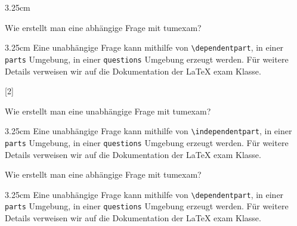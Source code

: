 \documentclass[german, @CLASSOPTIONS@]{tumexam}
\begin{document}
\begin{questions}
\begin{parts}
\begin{solutionbox}{3.25cm}
    \end{solutionbox}
    \dependentpart
    Wie erstellt man eine abhängige Frage mit tumexam?
    \begin{solutionbox}{3.25cm}
      Eine unabhängige Frage kann mithilfe von \texttt{\textbackslash{dependentpart}}, in einer \texttt{parts} Umgebung, in einer \texttt{questions} Umgebung erzeugt werden. Für weitere Details verweisen wir auf die Dokumentation der \LaTeX{} exam Klasse.
    \end{solutionbox}
  \end{parts}
  \clearpage
  [2]
  \begin{parts}
    \independentpart
    Wie erstellt man eine unabhängige Frage mit tumexam?
    \begin{solutionbox}{3.25cm}
      Eine unabhängige Frage kann mithilfe von \texttt{\textbackslash{independentpart}}, in einer \texttt{parts} Umgebung, in einer \texttt{questions} Umgebung erzeugt werden. Für weitere Details verweisen wir auf die Dokumentation der \LaTeX{} exam Klasse.
    \end{solutionbox}
    \dependentpart
    Wie erstellt man eine abhängige Frage mit tumexam?
    \begin{solutionbox}{3.25cm}
      Eine unabhängige Frage kann mithilfe von \texttt{\textbackslash{dependentpart}}, in einer \texttt{parts} Umgebung, in einer \texttt{questions} Umgebung erzeugt werden. Für weitere Details verweisen wir auf die Dokumentation der \LaTeX{} exam Klasse.
    \end{solutionbox}
  \end{parts}
  \clearpage
\end{questions}
\end{document}
